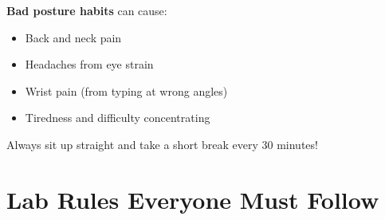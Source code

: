 \begin{warnbox}
\textbf{Bad posture habits} can cause:
\begin{itemize}[leftmargin=*, itemsep=2pt]
  \item Back and neck pain
  \item Headaches from eye strain
  \item Wrist pain (from typing at wrong angles)
  \item Tiredness and difficulty concentrating
\end{itemize}
Always sit up straight and take a short break every 30 minutes!
\end{warnbox}

\section{Lab Rules Everyone Must Follow}
\label{sec:lab-rules-list}

